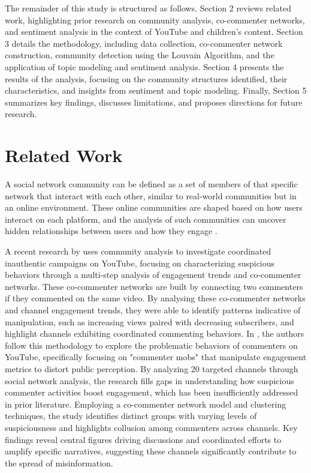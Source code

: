 \documentclass[12pt]{article}
\begin{document}
The remainder of this study is structured as follows. Section 2 reviews related work, highlighting 
prior research on community analysis, co-commenter networks, and sentiment analysis in the context 
of YouTube and children's content. Section 3 details the methodology, including data collection, 
co-commenter network construction, community detection using the Louvain Algorithm, and the application 
of topic modeling and sentiment analysis. Section 4 presents the results of the analysis, focusing 
on the community structures identified, their characteristics, and insights from sentiment and topic 
modeling. Finally, Section 5 summarizes key findings, discusses limitations, and proposes directions for 
future research.

\section{Related Work}

A social network community can be defined as a set of members of that specific network that interact
with each other, similar to real-world communities but in an online environment.
These online communities are shaped based on how users interact on each platform, and the analysis
of such communities can uncover hidden relationships between users and how they engage \cite{nooribakhsh2024community}.

A recent research by \cite{kirdemir2023} uses community analysis to investigate coordinated 
inauthentic campaigns on YouTube, focusing on characterizing suspicious behaviors through a 
multi-step analysis of engagement trends and co-commenter networks. These co-commenter networks are
built by connecting two commenters if they commented on the same video.
By analysing these co-commenter networks and channel engagement trends, they were able to identify
patterns indicative of manipulation, such as increasing views paired with decreasing subscribers, 
and highlight channels exhibiting coordinated 
commenting behaviors. In \cite{shajari2023}, the authors follow this methodology to
explore the problematic behaviors of commenters on YouTube, specifically focusing on "commenter mobs" 
that manipulate engagement metrics to distort public perception. 
By analyzing 20 targeted channels through social network analysis, the research fills gaps in 
understanding how suspicious commenter activities boost engagement, which has been insufficiently 
addressed in prior literature. Employing a co-commenter network model and clustering techniques, 
the study identifies distinct groups with varying levels of suspiciousness and highlights collusion 
among commenters across channels. Key findings reveal central figures driving discussions and 
coordinated efforts to amplify specific narratives, suggesting these channels significantly contribute 
to the spread of misinformation. 
\end{document}
